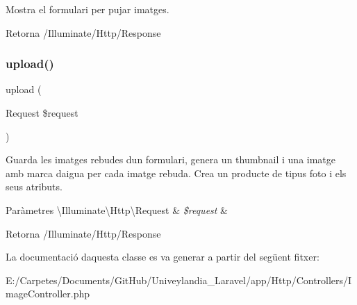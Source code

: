 Mostra el formulari per pujar imatges.

\begin{DoxyReturn}{Retorna}
/\+Illuminate/\+Http/\+Response 
\end{DoxyReturn}
\mbox{\label{class_app_1_1_http_1_1_controllers_1_1_image_controller_abc332ce722c8ad0e5e856fb246d68495}} 
\subsubsection{\texorpdfstring{upload()}{upload()}}
{\footnotesize\ttfamily upload (\begin{DoxyParamCaption}\item[{Request}]{\$request }\end{DoxyParamCaption})}

Guarda les imatges rebudes d\textquotesingle{}un formulari, genera un thumbnail i una imatge amb marca d\textquotesingle{}aigua per cada imatge rebuda. Crea un producte de tipus foto i els seus atributs.


\begin{DoxyParams}[1]{Paràmetres}
\textbackslash{}\+Illuminate\textbackslash{}\+Http\textbackslash{}\+Request & {\em \$request} & \\
\hline
\end{DoxyParams}
\begin{DoxyReturn}{Retorna}
/\+Illuminate/\+Http/\+Response 
\end{DoxyReturn}


La documentació d\textquotesingle{}aquesta classe es va generar a partir del següent fitxer\+:\begin{DoxyCompactItemize}
\item 
E\+:/\+Carpetes/\+Documents/\+Git\+Hub/\+Univeylandia\+\_\+\+Laravel/app/\+Http/\+Controllers/Image\+Controller.\+php\end{DoxyCompactItemize}
